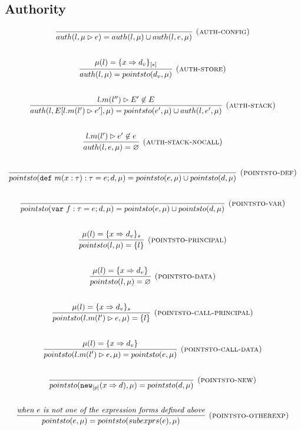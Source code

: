 \documentclass{llncs}
\newcommand{\keywadj}[1]{\mathtt{#1}}
\newcommand{\keyw}[1]{\keywadj{#1}~}
\begin{document}
\newpage

\subsection{Authority}

\[
\begin{array}{c}
\infer[\textsc{(auth-config)}]
  {auth(l,\mu \rhd e) = auth(l,\mu) \cup auth(l,e,\mu)}
  {}\\[5ex]

\infer[\textsc{(auth-store)}]
  {auth(l,\mu) = pointsto(d_v,\mu)}
  {\mu(l) = \{ x \Rightarrow d_v \}_{[s]}}\\[5ex]
  
\infer[\textsc{(auth-stack)}]
  {auth(l,E[l.m(l') \rhd e'],\mu) = pointsto(e',\mu) \cup auth(l,e',\mu)}
  {l.m(l'') \rhd E' \not\in E}\\[5ex]
  
\infer[\textsc{(auth-stack-nocall)}]
  {auth(l,e,\mu) = \varnothing}
  {l.m(l') \rhd e' \not\in e}\\[5ex]
  
\infer[\textsc{(pointsto-def)}]
  {pointsto(\keyw{def} m(x:\tau):\tau = e; d,\mu) = pointsto(e,\mu) \cup pointsto(d,\mu)}
  {}\\[5ex]
  
\infer[\textsc{(pointsto-var)}]
  {pointsto(\keyw{var} f:\tau = e; d,\mu) = pointsto(e,\mu) \cup pointsto(d,\mu)}
  {}\\[5ex]
  
\infer[\textsc{(pointsto-principal)}]
  {pointsto(l,\mu) = \{ l \}}
  {\mu(l) = \{ x \Rightarrow d_v \}_s}\\[5ex]
  
\infer[\textsc{(pointsto-data)}]
  {pointsto(l,\mu) = \varnothing }
  {\mu(l) = \{ x \Rightarrow d_v \}}\\[5ex]

\infer[\textsc{(pointsto-call-principal)}]
  {pointsto(l.m(l') \rhd e,\mu) = \{l\} }
  {\mu(l) = \{ x \Rightarrow d_v \}_s}\\[5ex]
  
\infer[\textsc{(pointsto-call-data)}]
  {pointsto(l.m(l') \rhd e,\mu) = pointsto(e,\mu)}
  {\mu(l) = \{ x \Rightarrow d_v \}}\\[5ex]
  
\infer[\textsc{(pointsto-new)}]
  {pointsto(\keywadj{new}_{[p]}(x \Rightarrow d),\mu) = pointsto(d,\mu) }
  {}\\[5ex]
  
\infer[\textsc{(pointsto-otherexp)}]
  {pointsto(e,\mu) = pointsto(subexprs(e),\mu) }
  {\textit{when $e$ is not one of the expression forms defined above}}\\[5ex]

\end{array}
\]
\end{document}

